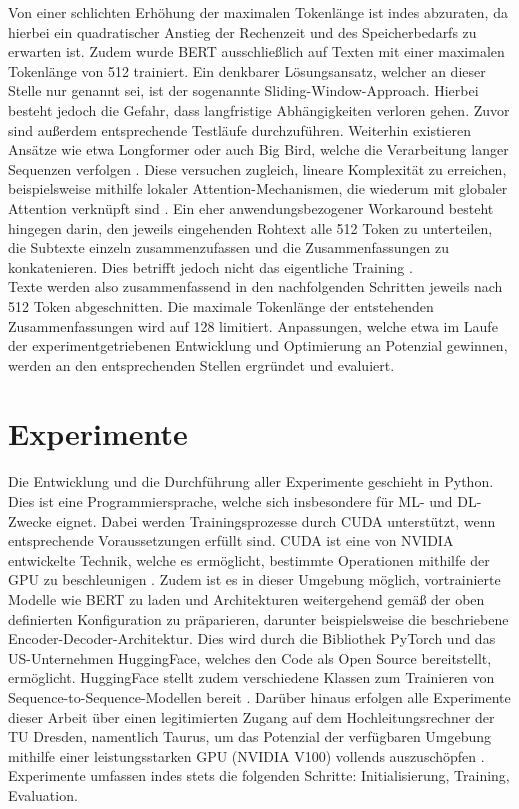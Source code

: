 \noindent
Von einer schlichten Erhöhung der maximalen Tokenlänge ist indes abzuraten, da hierbei ein quadratischer Anstieg der Rechenzeit und des Speicherbedarfs zu erwarten ist. Zudem wurde \ac{BERT} ausschließlich auf Texten mit einer maximalen Tokenlänge von 512 trainiert. Ein denkbarer Lösungsansatz, welcher an dieser Stelle nur genannt sei, ist der sogenannte Sliding-Window-Approach. Hierbei besteht jedoch die Gefahr, dass langfristige Abhängigkeiten verloren gehen. Zuvor sind außerdem entsprechende Testläufe durchzuführen. Weiterhin existieren Ansätze wie etwa Longformer oder auch Big Bird, welche die Verarbeitung langer Sequenzen verfolgen \cite{ZAH21}. Diese versuchen zugleich, lineare Komplexität zu erreichen, beispielsweise mithilfe lokaler Attention-Mechanismen, die wiederum mit globaler Attention verknüpft sind \cite{BEL20}. Ein eher anwendungsbezogener Workaround besteht hingegen darin, den jeweils eingehenden Rohtext alle 512 Token zu unterteilen, die Subtexte einzeln zusammenzufassen und die Zusammenfassungen zu konkatenieren. Dies betrifft jedoch nicht das eigentliche Training \cite[S.~2]{DIN20}.\\

\noindent
Texte werden also zusammenfassend in den nachfolgenden Schritten jeweils nach 512 Token abgeschnitten. Die maximale Tokenlänge der entstehenden Zusammenfassungen wird auf 128 limitiert. Anpassungen, welche etwa im Laufe der experimentgetriebenen Entwicklung und Optimierung an Potenzial gewinnen, werden an den entsprechenden Stellen ergründet und evaluiert.\\


\section{Experimente}
\noindent
Die Entwicklung und die Durchführung aller Experimente geschieht in Python. Dies ist eine Programmiersprache, welche sich insbesondere für \ac{ML}- und \ac{DL}-Zwecke eignet. Dabei werden Trainingsprozesse durch \ac{CUDA} unterstützt, wenn entsprechende Voraussetzungen erfüllt sind. \ac{CUDA} ist eine von NVIDIA entwickelte Technik, welche es ermöglicht, bestimmte Operationen mithilfe der GPU zu beschleunigen \cite{NVI21}. Zudem ist es in dieser Umgebung möglich, vortrainierte Modelle wie \ac{BERT} zu laden und Architekturen weitergehend gemäß der oben definierten Konfiguration zu präparieren, darunter beispielsweise die beschriebene Encoder-Decoder-Architektur. Dies wird durch die Bibliothek PyTorch und das US-Unternehmen HuggingFace, welches den Code als Open Source bereitstellt, ermöglicht. HuggingFace stellt zudem verschiedene Klassen zum Trainieren von Sequence-to-Sequence-Modellen bereit \cite{HUG21}. Darüber hinaus erfolgen alle Experimente dieser Arbeit über einen legitimierten Zugang auf dem Hochleitungsrechner der TU Dresden, namentlich Taurus, um das Potenzial der verfügbaren Umgebung mithilfe einer leistungsstarken GPU (NVIDIA V100) vollends auszuschöpfen \cite{ZIH21}. Experimente umfassen indes stets die folgenden Schritte: Initialisierung, Training, Evaluation.\\

